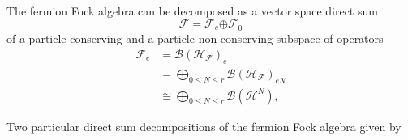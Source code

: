 \documentclass[aps,preprint]{revtex4}%
\begin{document}
The fermion Fock algebra can be decomposed as a vector space direct sum%
\begin{equation}
\mathcal{F=F}_{e}\mathcal{\oplus F}_{0}%
\end{equation}
of a particle conserving and a particle non conserving subspace of operators
\begin{align}
\mathcal{F}_{e} &  =\mathcal{B}\left(  \mathcal{H}_{\mathcal{F}}\right)
_{e}\nonumber\\
&  =%
{\displaystyle\bigoplus\limits_{0\leq N\leq r}}
\mathcal{B}\left(  \mathcal{H}_{\mathcal{F}}\right)  _{eN}\label{BanSp}\\
&  \cong%
{\displaystyle\bigoplus\limits_{0\leq N\leq r}}
\mathcal{B}\left(  \mathcal{H}^{N}\right)  ,\label{BanAlg}%
\end{align}




Two particular direct sum decompositions of the fermion Fock algebra given by  
\end{document}
